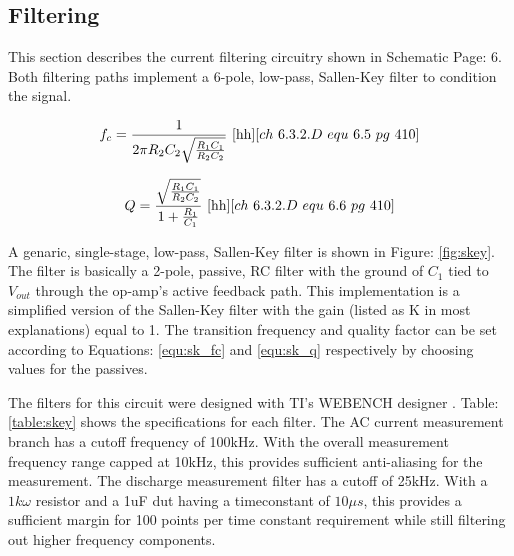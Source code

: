\subsection{Filtering}
\label{sec:filtering}
\nocite{kirk_skey}

This section describes the current filtering circuitry shown in Schematic Page: 6. Both filtering paths implement a 6-pole, low-pass, Sallen-Key filter to condition the signal.



\begin{equation}
    \label{equ:sk_fc}
    f_c = \frac{1}{2\pi R_2C_2\sqrt{\frac{R_1C_1}{R_2C_2}}}
    ~\cite{hh}[ch~6.3.2.D~equ~6.5~pg~410]
\end{equation}

\begin{equation}
    \label{equ:sk_q}
    Q = \frac{\sqrt{\frac{R_1C_1}{R_2C_2}}}{1 + \frac{R_1}{C_1}}
    ~\cite{hh}[ch~6.3.2.D~equ~6.6~pg~410]
\end{equation}

A genaric, single-stage, low-pass, Sallen-Key filter is shown in Figure: \ref{fig:skey}. The filter is basically a 2-pole, passive, RC filter with the ground of $C_1$ tied to $V_{out}$ through the op-amp's active feedback path. This implementation is a simplified version of the Sallen-Key filter with the gain (listed as K in most explanations) equal to 1. The transition frequency and quality factor can be set according to Equations: \eqref{equ:sk_fc} and \eqref{equ:sk_q} respectively by choosing values for the passives.



The filters for this circuit were designed with TI's WEBENCH designer \cite{webench}. Table: \ref{table:skey} shows the specifications for each filter. 
The AC current measurement branch has a cutoff frequency of 100kHz. With the overall measurement frequency range capped at 10kHz, this provides sufficient anti-aliasing for the measurement. The discharge measurement filter has a cutoff of 25kHz. With a $1k\omega$ resistor and a 1uF \gls{dut} having a timeconstant of $10\mu s$, this provides a sufficient margin for 100 points per time constant requirement while still filtering out higher frequency components.

